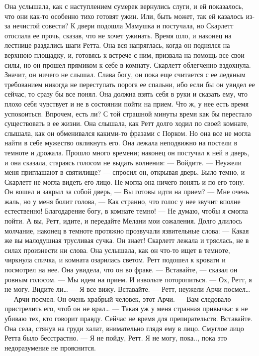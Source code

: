 Она услышала, как с наступлением сумерек вернулись слуги, и ей показалось, что они как-то особенно тихо готовят ужин. Или, быть может, так ей казалось из-за нечистой совести? К двери подошла Мамушка и постучала, но Скарлетт отослала ее прочь, сказав, что не хочет ужинать. Время шло, и наконец на лестнице раздались шаги Ретта. Она вся напряглась, когда он поднялся на верхнюю площадку, и, готовясь к встрече с ним, призвала на помощь все свои силы, но он прошел прямиком к себе в комнату. Скарлетт облегченно вздохнула. Значит, он ничего не слышал. Слава богу, он пока еще считается с ее ледяным требованием никогда не переступать порога ее спальни, ибо если бы он увидел ее сейчас, то сразу бы все понял. Она должна взять себя в руки и сказать ему, что плохо себя чувствует и не в состоянии пойти на прием. Что ж, у нее есть время успокоиться. Впрочем, есть ли? С той страшной минуты время как бы перестало существовать в ее жизни. Она слышала, как Ретт долго ходил по своей комнате, слышала, как он обменивался какими-то фразами с Порком. Но она все не могла найти в себе мужество окликнуть его. Она лежала неподвижно на постели в темноте и дрожала.
Прошло много времени; наконец он постучал к ней в дверь, и она сказала, стараясь голосом не выдать волнения:
— Войдите.
— Неужели меня приглашают в святилище? — спросил он, открывая дверь. Было темно, и Скарлетт не могла видеть его лицо. Не могла она ничего понять и по его тону. Он вошел и закрыл за собой дверь, — Вы готовы идти на прием?
— Мне очень жаль, но у меня болит голова, — Как странно, что голос у нее звучит вполне естественно! Благодарение богу, в комнате темно! — Не думаю, чтобы я смогла пойти. А вы, Ретт, идите, и передайте Мелани мои сожаления.
Долго длилось молчание, наконец в темноте протяжно прозвучали язвительные слова:
— Какая же вы малодушная трусливая сучка. Он знает! Скарлетт лежала и тряслась, не в силах произнести ни слова. Она услышала, как он что-то ищет в темноте, чиркнула спичка, и комната озарилась светом. Ретт подошел к кровати и посмотрел на нее. Она увидела, что он во фраке.
— Вставайте, — сказал он ровным голосом. — Мы идем на прием. И извольте поторопиться.
— Ох, Ретт, я не могу. Видите ли…
— Я все вижу. Вставайте.
— Ретт, неужели Арчи посмел…
— Арчи посмел. Он очень храбрый человек, этот Арчи.
— Вам следовало пристрелить его, чтоб он не врал…
— Такая уж у меня странная привычка: я не убиваю тех, кто говорит правду. Сейчас не время для препирательств. Вставайте.
Она села, стянув на груди халат, внимательно глядя ему в лицо. Смуглое лицо Ретта было бесстрастно.
— Я не пойду, Ретт. Я не могу, пока.., пока это недоразумение не прояснится.

